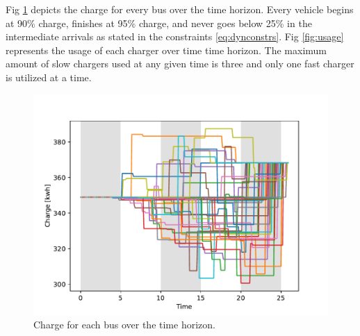 \documentclass[letterpaper, 10pt, conference]{IEEEtran}
\begin{document}
Fig \ref{fig:charges} depicts the charge for every bus over the time horizon. Every vehicle begins at 90\% charge, finishes at 95\% charge, and never goes below 25\% in the intermediate arrivals as stated in the constraints \eqref{eq:dynconstrs}. Fig \ref{fig:usage} represents the usage of each charger over time time horizon. The maximum amount of slow chargers used at any given time is three and only one fast charger is utilized at a time.

\begin{figure}[ht]
	\centering
	\includegraphics[trim=0in 0in 0in 0in, width=\linewidth]{charges.pdf}
	\caption{Charge for each bus over the time horizon.}
	\label{fig:charges}
\end{figure}
\end{document}
